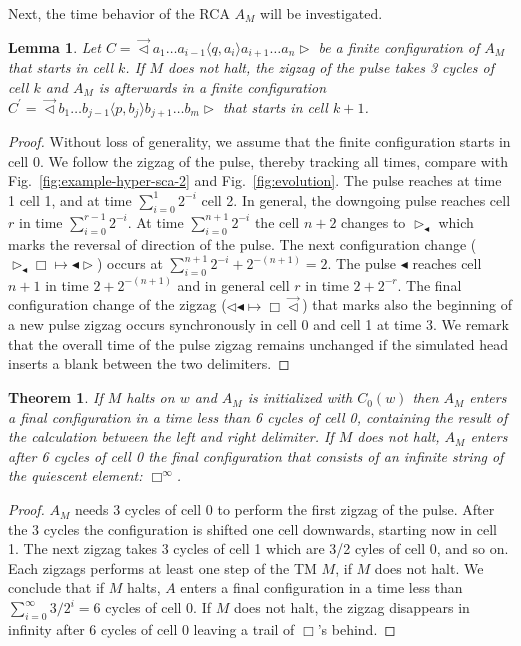 \documentclass[pre,amssymb,showpacs,showkeys,preprint]{revtex4}
\newtheorem{theorem}{Theorem}
\newtheorem{lemma}{Lemma}
\begin{document}
Next, the time behavior of the RCA $A_M$ will be investigated.
\begin{lemma}
Let $C=\overrightarrow{\lhd}  a_1 \ldots a_{i-1} \langle q,a_i \rangle a_{i+1} \ldots a_n \rhd$
be a finite configuration of $A_M$ that starts in cell $k$.
If $M$ does not halt, the zigzag of the pulse takes 3 cycles of cell $k$ and $A_M$
is afterwards in a finite configuration
$C^\prime=\overrightarrow{\lhd}  b_1 \ldots b_{j-1} \langle p,b_j \rangle b_{j+1} \ldots b_m \rhd$
that starts in cell $k + 1$.
\end{lemma}
\begin{proof}
Without loss of generality, we assume that the finite configuration starts in cell 0.
We follow the zigzag of the pulse, thereby tracking all times,
compare with Fig.~\ref{fig:example-hyper-sca-2} and Fig.~\ref{fig:evolution}.
The pulse reaches at time 1 cell 1,
and at time $\sum_{i=0}^1 2^{-i}$ cell 2.
In general, the downgoing pulse reaches cell $r$ in time $\sum_{i=0}^{r-1} 2^{-i}$.
At time $\sum_{i=0}^{n+1} 2^{-i}$ the cell $n+2$ changes to $\rhd_\blacktriangleleft$
which marks the reversal of direction of the pulse.
The next configuration change ($\rhd_\blacktriangleleft \Box \mapsto \blacktriangleleft \rhd$)
occurs at $\sum_{i=0}^{n+1} 2^{-i} + 2^{-(n+1)} = 2$.
The pulse $\blacktriangleleft$ reaches cell $n+1$ in time $2 + 2^{-(n+1)}$ and in general
cell $r$ in time $2 + 2^{-r}$.
The final configuration change of the zigzag ($\lhd  \blacktriangleleft \mapsto \Box  \overrightarrow{\lhd}$)
that marks also the beginning of a new pulse zigzag occurs synchronously in cell 0 and cell 1 at time 3.
We remark that the overall time of the pulse zigzag remains unchanged if the
simulated head inserts a blank between the two delimiters.
\end{proof}

\begin{theorem}
\label{th-rca}
If $M$ halts on $w$ and $A_M$ is initialized with $C_0(w)$ then $A_M$ enters a final
configuration in a time less than 6 cycles of cell 0, containing the result of the calculation between the left
and right delimiter.
If $M$ does not halt, $A_M$ enters after 6 cycles of cell 0 the final configuration that consists
of an infinite string of the quiescent element: $\Box^\infty$.
\end{theorem}
\begin{proof}
$A_M$ needs 3 cycles of cell 0 to perform the first zigzag of the pulse.
After the 3 cycles the configuration is shifted one cell downwards, starting now in cell 1.
The next zigzag takes 3 cycles of cell 1 which are 3/2 cyles of cell 0, and so on.
Each zigzags performs at least one step of the TM $M$, if $M$ does not halt.
We conclude that if $M$ halts, $A$ enters a final configuration in a time less than
$\sum_{i=0}^\infty 3/2^{i} = 6$ cycles of cell 0.
If $M$ does not halt, the zigzag disappears in infinity after 6 cycles of cell 0 leaving a trail of $\Box$'s behind.
\end{proof}
\end{document}
